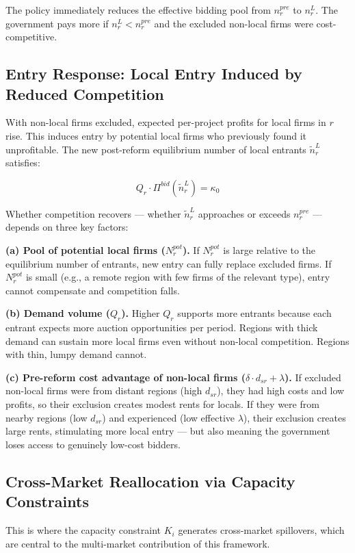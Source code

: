 \documentclass[10pt]{article}
\begin{document}
The policy immediately reduces the effective bidding pool from $n_r^{pre}$ to $n_r^{L}$. The government pays more if $n_r^L < n_r^{pre}$ and the excluded non-local firms were cost-competitive.

\subsection{Entry Response: Local Entry Induced by Reduced Competition}

With non-local firms excluded, expected per-project profits for local firms in $r$ rise. This induces entry by potential local firms who previously found it unprofitable. The new post-reform equilibrium number of local entrants $\tilde{n}_r^L$ satisfies:

\[
  Q_r \cdot \Pi^{bid}(\tilde{n}_r^L) = \kappa_0
\]

Whether competition recovers --- whether $\tilde{n}_r^L$ approaches or exceeds $n_r^{pre}$ --- depends on three key factors:

\medskip
\noindent\textbf{(a) Pool of potential local firms ($N_r^{pot}$).} If $N_r^{pot}$ is large relative to the equilibrium number of entrants, new entry can fully replace excluded firms. If $N_r^{pot}$ is small (e.g., a remote region with few firms of the relevant type), entry cannot compensate and competition falls.

\medskip
\noindent\textbf{(b) Demand volume ($Q_r$).} Higher $Q_r$ supports more entrants because each entrant expects more auction opportunities per period. Regions with thick demand can sustain more local firms even without non-local competition. Regions with thin, lumpy demand cannot.

\medskip
\noindent\textbf{(c) Pre-reform cost advantage of non-local firms ($\delta \cdot d_{sr} + \lambda$).} If excluded non-local firms were from distant regions (high $d_{sr}$), they had high costs and low profits, so their exclusion creates modest rents for locals. If they were from nearby regions (low $d_{sr}$) and experienced (low effective $\lambda$), their exclusion creates large rents, stimulating more local entry --- but also meaning the government loses access to genuinely low-cost bidders.

\subsection{Cross-Market Reallocation via Capacity Constraints}

This is where the capacity constraint $K_i$ generates cross-market spillovers, which are central to the multi-market contribution of this framework.
\end{document}
